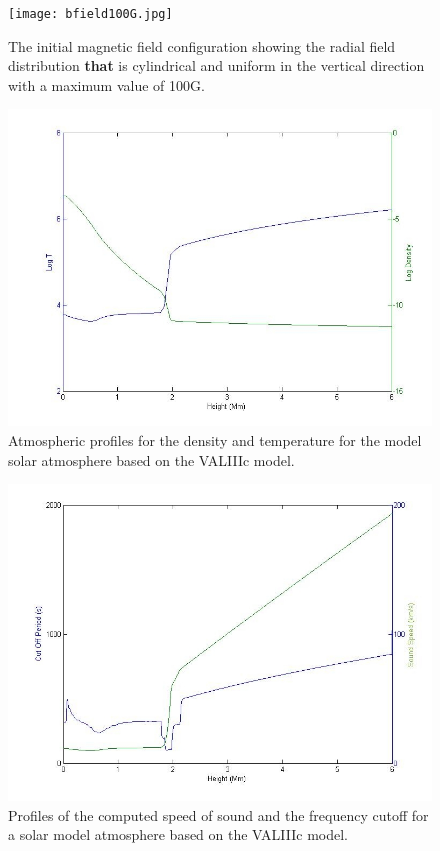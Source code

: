 \documentclass[physics,article,submit,pdftex,moreauthors]{Definitions/mdpi}
\begin{document}
\begin{figure}[h]\label{inimagfieldplot}
\centering
\texttt{[image: bfield100G.jpg]}
\caption{The initial magnetic field configuration showing the radial field distribution {\bf that} is cylindrical and uniform in the vertical direction with a maximum value of 100G.}
\end{figure}

\break


\begin{figure}[h]\label{soundspeedVAL3C_profile_fig1R}
\includegraphics[scale=1.8]{VAL3C_rho_temp_fig1L.jpg}
\caption{Atmospheric profiles for the density and temperature for the model solar atmosphere based on the VALIIIc model.}
\end{figure}

\begin{figure}[h]\label{soundspeedVAL3C_profile_fig1L}
\includegraphics[scale=1.8]{soundspeedVAL3C_profile_fig1R.jpg}
\caption{Profiles of the computed speed of sound and the frequency cutoff for a solar model atmosphere based on the VALIIIc model.  }
\end{figure}
\end{document}
